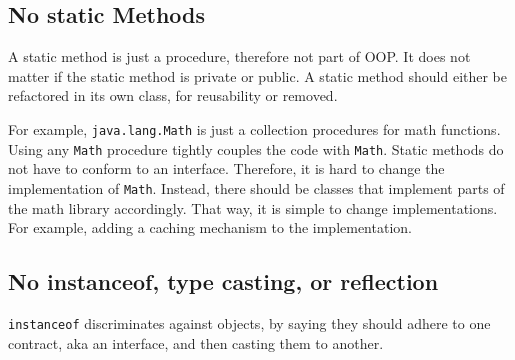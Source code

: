 \subsection{No static Methods}\label{subsec:no-static-methods}
A static method is just a procedure, therefore not part of \gls{OOP}.
It does not matter if the static method is private or public.
A static method should either be refactored in its own class, for reusability or removed.

For example, \texttt{java.lang.Math} is just a collection procedures for math functions.
Using any \texttt{Math} procedure tightly couples the code with \texttt{Math}.
Static methods do not have to conform to an interface.
Therefore, it is hard to change the implementation of \texttt{Math}.
Instead, there should be classes that implement parts of the math library accordingly.
That way, it is simple to change implementations.
For example, adding a caching mechanism to the implementation.

\subsection{No instanceof, type casting, or reflection}\label{subsec:no-instanceof-type-casting-or-reflection}
\texttt{instanceof} discriminates against objects, by saying they should adhere to one contract, aka an interface, and then casting them to another.
